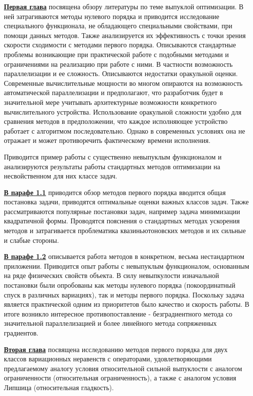 \underline{\textbf{Первая глава}} посвящена обзору литературы по теме выпуклой оптимизации. В ней затрагиваются методы нулевого порядка и приводится исследование специального функционала, не обладающего специальными свойствами, при помощи данных методов. Также анализируется их эффективность с точки зрения скорости сходимости с методами первого порядка. Описываются стандартные проблемы возникающие при практической работе с подобными методами и ограничениями на реализацию при работе с ними. В частности возможность параллелизации и ее сложность. Описываются недостатки оракульной оценки. Современные вычислительные мощности во многом опираются на возможность автоматической параллелизации и предполагают, что разработчик будет в значительной мере учитывать архитектурные возможности конкретного вычислительного устройства. Использование оракульной сложности удобно для сравнения методов в предположении, что каждое исполняющее устройство работает с алгоритмом последовательно. Однако в современных условиях она не отражает и может противоречить фактическому времени исполнения. 

Приводится пример работы с существенно невыпуклым функционалом и анализируются результаты работы стандартных методов оптимизации на несвойственном для них классе задач. 

\underline{\textbf{В парафе 1.1}} приводится обзор методов первого порядка вводится общая постановка задачи, приводятся оптимальные оценки важных классов задач. Также рассматриваются популярные постановки задач, например задача минимизации квадратичной формы. Проводятся пояснения о стандартных методах ускорения методов и затрагивается проблематика квазиньютоновских методов и их сильные и слабые стороны.


\underline{\textbf{В парафе 1.2}} описывается работа методов в конкретном, весьма нестандартном приложении. Приводится опыт работы с невыпуклым функционалом, основанным на ряде физических свойств объекта. В силу невыпкулости изначальной постановки были опробованы как методы нулевого порядка (покоординатный спуск в различных вариациях), так и методы первого порядка. Поскольку задача является практической одним из приоритетов было качество и скорость работы. В итоге возникло интересное противопоставление - безградиентного метода со значительной параллелизацией и более линейного метода сопряженных градиентов. 


\underline{\textbf{Вторая глава}} посвящена исследованию методов первого порядка для двух классов вариационных неравенств с операторами, удовлетворяющими предлагаемому аналогу условия относительной сильной выпуклости с аналогом ограниченности (относительная ограниченность), а также с аналогом условия Липшица (относительная гладкость).

